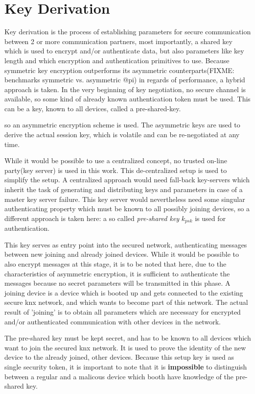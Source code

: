 \section{Key Derivation}

Key derivation is the process of establishing parameters for secure communication between 2 or more communication partners, most importantly,
a shared key 
which is used to encrypt and/or authenticate data, but also parameters like key length and which encryption and authentication primitives to use.
Because symmetric key encryption outperforms its asymmetric counterparts(FIXME: benchmarks symmetric vs. asymmetric @pi) in regards of performance, a hybrid 
approach is taken. In the very beginning of key negotiation, no secure channel is available, so some kind of already known authentication token must be used.
This can be a key, known to all devices, called a pre-shared-key. 

so an asymmetric encryption scheme is used.
The asymmetric keys are used to derive the actual session key, which is volatile and can be re-negotiated at any time. 

While it would be possible to use a centralized concept, no trusted on-line party(key server) is used in this work. This de-centralized setup is used
to simplify the setup. A centralized approach would need fall-back key-servers
which inherit the task of generating and distributing keys and parameters in case of a master key server 
failure. This key server would nevertheless need some singular authenticating property which must be known
to all possibly joining devices, so a different approach is taken here: a so called \textit{pre-shared key} $k_{psk}$ is used for authentication. 

This key serves as entry point into the
secured network, authenticating messages between new joining and already joined devices. While it would be possible to also encrypt messages at this stage,
it is to be noted that here, due to the characteristics of asymmetric encryption, it is sufficient to authenticate
the messages because no secret parameters will be transmitted in this phase. A joining device is a device which
is booted up and gets connected to the existing secure knx network, and which wants to become part of this network. The actual
result of 'joining' is to obtain all parameters which are necessary for encrypted and/or authenticated communication with other
devices in the network.

The pre-shared key must be kept secret, and has to be known to all
devices which want to join the secured knx network. It is used to prove the identity of the new device to the already joined, other
devices. Because this setup key is used as single security token, it is important to note that it is \textbf{impossible} to distinguish between a regular and a malicous device which booth 
have knowledge of the pre-shared key.




